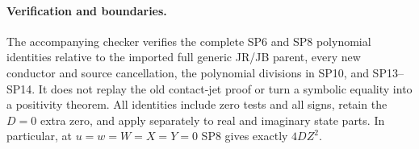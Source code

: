 \paragraph{Verification and boundaries.}
The accompanying checker verifies the complete SP6 and SP8 polynomial
identities relative to the imported full generic JR/JB parent, every
new conductor and source cancellation, the polynomial divisions in
SP10, and SP13--SP14. It does not replay the old contact-jet proof or
turn a symbolic equality into a positivity theorem. All identities
include zero tests and all signs, retain the $D=0$ extra zero, and
apply separately to real and imaginary state parts. In particular,
at $u=w=W=X=Y=0$ SP8 gives exactly $4DZ^2$.
